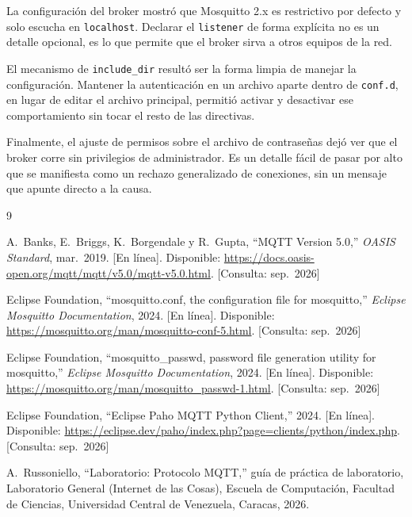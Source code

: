 La configuración del broker mostró que Mosquitto 2.x es restrictivo por defecto y solo escucha
en \texttt{localhost}. Declarar el \texttt{listener} de forma explícita no es un detalle
opcional, es lo que permite que el broker sirva a otros equipos de la red.

El mecanismo de \texttt{include\_dir} resultó ser la forma limpia de manejar la configuración.
Mantener la autenticación en un archivo aparte dentro de \texttt{conf.d}, en lugar de editar el
archivo principal, permitió activar y desactivar ese comportamiento sin tocar el resto de las
directivas.

Finalmente, el ajuste de permisos sobre el archivo de contraseñas dejó ver que el broker corre
sin privilegios de administrador. Es un detalle fácil de pasar por alto que se manifiesta como
un rechazo generalizado de conexiones, sin un mensaje que apunte directo a la causa.

\clearpage
\begingroup
\small
\begin{thebibliography}{9}

A.~Banks, E.~Briggs, K.~Borgendale y R.~Gupta, ``MQTT Version 5.0,''
\emph{OASIS Standard}, mar.~2019. [En línea]. Disponible:
\url{https://docs.oasis-open.org/mqtt/mqtt/v5.0/mqtt-v5.0.html}.
[Consulta: sep.~2026]

Eclipse Foundation, ``mosquitto.conf, the configuration file for mosquitto,''
\emph{Eclipse Mosquitto Documentation}, 2024. [En línea]. Disponible:
\url{https://mosquitto.org/man/mosquitto-conf-5.html}. [Consulta: sep.~2026]

Eclipse Foundation, ``mosquitto\_passwd, password file generation utility for mosquitto,''
\emph{Eclipse Mosquitto Documentation}, 2024. [En línea]. Disponible:
\url{https://mosquitto.org/man/mosquitto_passwd-1.html}. [Consulta: sep.~2026]

Eclipse Foundation, ``Eclipse Paho MQTT Python Client,'' 2024. [En línea]. Disponible:
\url{https://eclipse.dev/paho/index.php?page=clients/python/index.php}.
[Consulta: sep.~2026]

A.~Russoniello, ``Laboratorio: Protocolo MQTT,'' guía de práctica de laboratorio,
Laboratorio General (Internet de las Cosas), Escuela de Computación,
Facultad de Ciencias, Universidad Central de Venezuela, Caracas, 2026.

\end{thebibliography}
\endgroup


